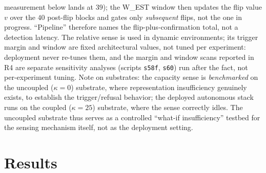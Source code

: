 \documentclass[preprint,12pt]{elsarticle}
\begin{document}
measurement below lands at $39$); the W\_EST window then updates the flip
value $v$ over the $40$ post-flip blocks and gates only \emph{subsequent}
flips, not the one in progress. ``Pipeline'' therefore names the
flip-plus-confirmation total, not a detection latency. The relative sense is used in dynamic environments; its
trigger margin and window are fixed architectural values, not tuned per
experiment: deployment never re-tunes them, and the margin and window scans
reported in R4 are separate sensitivity analyses (scripts \texttt{s58f},
\texttt{s60}) run after the fact, not per-experiment tuning. Note on substrates: the capacity sense is \emph{benchmarked}
on the uncoupled ($\kappa=0$) substrate, where representation
insufficiency genuinely exists, to establish the trigger/refusal behavior;
the deployed autonomous stack runs on the coupled ($\kappa=25$) substrate,
where the sense correctly idles. The uncoupled substrate thus serves as a
controlled ``what-if insufficiency'' testbed for the sensing mechanism
itself, not as the deployment setting.

\section{Results}
\label{sec:results}
\end{document}
